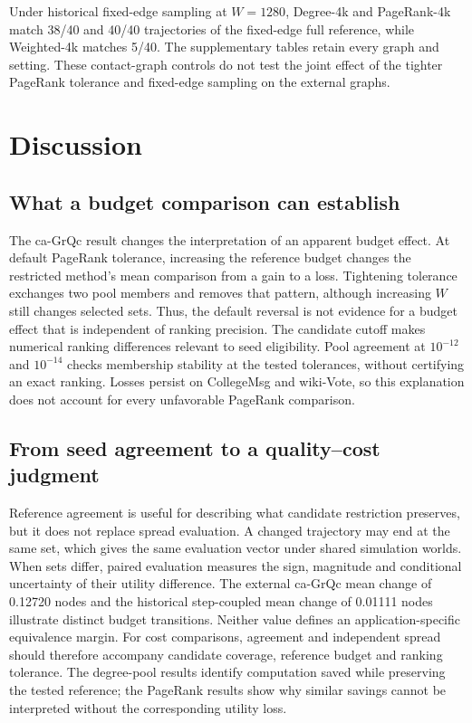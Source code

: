 \documentclass[smallextended]{svjour3}
\begin{document}
Under historical fixed-edge sampling at $W=1280$, Degree-4k and PageRank-4k match 38/40 and 40/40 trajectories of the fixed-edge full reference, while Weighted-4k matches 5/40. The supplementary tables retain every graph and setting. These contact-graph controls do not test the joint effect of the tighter PageRank tolerance and fixed-edge sampling on the external graphs.
\FloatBarrier

\section{Discussion}
\subsection{What a budget comparison can establish}
The ca-GrQc result changes the interpretation of an apparent budget effect. At default PageRank tolerance, increasing the reference budget changes the restricted method's mean comparison from a gain to a loss. Tightening tolerance exchanges two pool members and removes that pattern, although increasing $W$ still changes selected sets. Thus, the default reversal is not evidence for a budget effect that is independent of ranking precision. The candidate cutoff makes numerical ranking differences relevant to seed eligibility. Pool agreement at $10^{-12}$ and $10^{-14}$ checks membership stability at the tested tolerances, without certifying an exact ranking. Losses persist on CollegeMsg and wiki-Vote, so this explanation does not account for every unfavorable PageRank comparison.

\subsection{From seed agreement to a quality--cost judgment}
Reference agreement is useful for describing what candidate restriction preserves, but it does not replace spread evaluation. A changed trajectory may end at the same set, which gives the same evaluation vector under shared simulation worlds. When sets differ, paired evaluation measures the sign, magnitude and conditional uncertainty of their utility difference. The external ca-GrQc mean change of 0.12720 nodes and the historical step-coupled mean change of 0.01111 nodes illustrate distinct budget transitions. Neither value defines an application-specific equivalence margin. For cost comparisons, agreement and independent spread should therefore accompany candidate coverage, reference budget and ranking tolerance. The degree-pool results identify computation saved while preserving the tested reference; the PageRank results show why similar savings cannot be interpreted without the corresponding utility loss.
\end{document}
